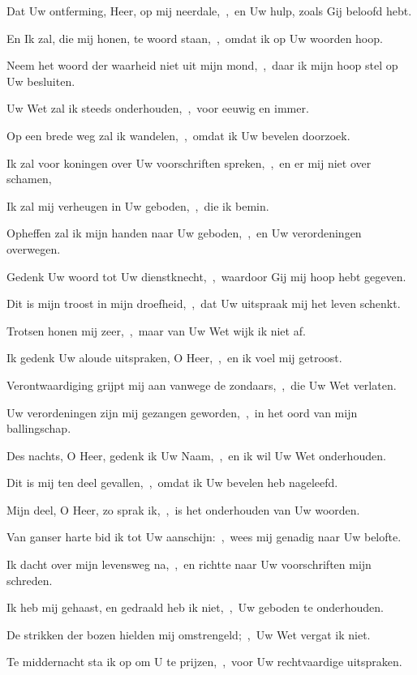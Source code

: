 \documentclass[12pt,twoside,a5paper]{article}
\begin{document}
\begin{halfparskip}
   Dat Uw ontferming, Heer, op mij neerdale,~\sep\ en Uw hulp, zoals Gij beloofd hebt.

  En Ik zal, die mij honen, te woord staan,~\sep\ omdat ik op Uw woorden hoop.

  Neem het woord der waarheid niet uit mijn mond,~\sep\ daar ik mijn hoop stel op Uw besluiten.

  Uw Wet zal ik steeds onderhouden,~\sep\ voor eeuwig en immer.

  Op een brede weg zal ik wandelen,~\sep\ omdat ik Uw bevelen doorzoek.

  Ik zal voor koningen over Uw voorschriften spreken,~\sep\ en er mij niet over schamen,

  Ik zal mij verheugen in Uw geboden,~\sep\ die ik bemin.

  Opheffen zal ik mijn handen naar Uw geboden,~\sep\ en Uw verordeningen overwegen.

   Gedenk Uw woord tot Uw dienstknecht,~\sep\ waardoor Gij mij hoop hebt gegeven.

  Dit is mijn troost in mijn droefheid,~\sep\ dat Uw uitspraak mij het leven schenkt.

  Trotsen honen mij zeer,~\sep\ maar van Uw Wet wijk ik niet af.

  Ik gedenk Uw aloude uitspraken, O Heer,~\sep\ en ik voel mij getroost.

  Verontwaardiging grijpt mij aan vanwege de zondaars,~\sep\ die Uw Wet verlaten.

  Uw verordeningen zijn mij gezangen geworden,~\sep\ in het oord van mijn ballingschap.

  Des nachts, O Heer, gedenk ik Uw Naam,~\sep\ en ik wil Uw Wet onderhouden.

  Dit is mij ten deel gevallen,~\sep\ omdat ik Uw bevelen heb nageleefd.

   Mijn deel, O Heer, zo sprak ik,~\sep\ is het onderhouden van Uw woorden.

  Van ganser harte bid ik tot Uw aanschijn:~\sep\ wees mij genadig naar Uw belofte.

  Ik dacht over mijn levensweg na,~\sep\ en richtte naar Uw voorschriften mijn schreden.

  Ik heb mij gehaast, en gedraald heb ik niet,~\sep\ Uw geboden te onderhouden.

  De strikken der bozen hielden mij omstrengeld;~\sep\ Uw Wet vergat ik niet.

  Te middernacht sta ik op om U te prijzen,~\sep\ voor Uw rechtvaardige uitspraken.


\end{halfparskip}
\end{document}
